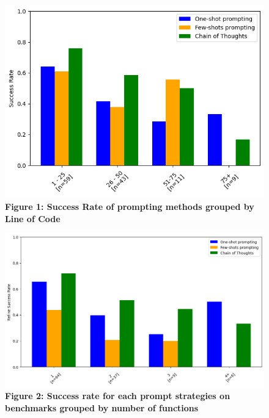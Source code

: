 \documentclass[onecolumn]{NobArticle}
\begin{document}
\begin{figure}[H]
    \centering
    \begin{minipage}{0.48\linewidth}
        \centering
        \includegraphics[width=\linewidth]{LineofCode_successrate.png}
        \textbf{Figure 1: Success Rate of prompting methods grouped by Line of Code}
        \label{fig:lineofcode-successrate}
    \end{minipage}
    \hfill
    \begin{minipage}{0.48\linewidth}
        \centering
        \includegraphics[width=\linewidth]{Function number_success rate.png}
        \textbf{Figure 2: Success rate for each prompt strategies on benchmarks grouped by number of functions}
        \label{fig:function-number-successrate}
    \end{minipage}
\end{figure}
\end{document}
